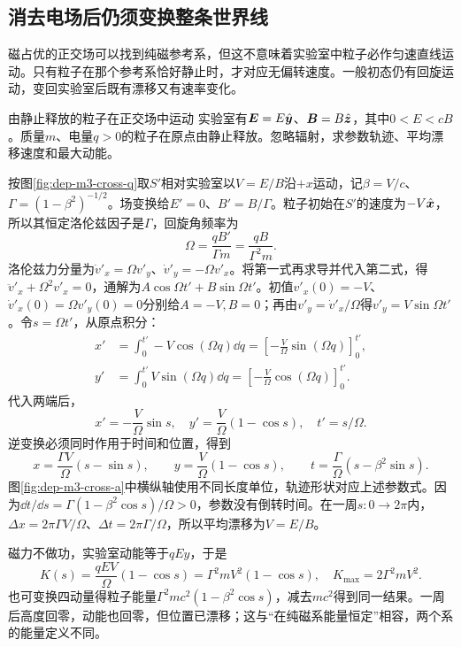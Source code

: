 \subsection{消去电场后仍须变换整条世界线}
磁占优的正交场可以找到纯磁参考系，但这不意味着实验室中粒子必作匀速直线运动。只有粒子在那个参考系恰好静止时，才对应无偏转速度。一般初态仍有回旋运动，变回实验室后既有漂移又有速率变化。

\begin{example}由静止释放的粒子在正交场中运动
实验室有$\bm{E}=E\hat{\bm{y}}$、$\bm{B}=B\hat{\bm{z}}$，其中$0<E<cB$。质量$m$、电量$q>0$的粒子在原点由静止释放。忽略辐射，求参数轨迹、平均漂移速度和最大动能。
\end{example}
\begin{solution}
按图\ref{fig:dep-m3-cross-q}取$S'$相对实验室以$V=E/B$沿$+x$运动，记$\beta=V/c$、$\Gamma=(1-\beta^2)^{-1/2}$。场变换给$E'=0$、$B'=B/\Gamma$。粒子初始在$S'$的速度为$-V\hat{\bm{x}}$，所以其恒定洛伦兹因子是$\Gamma$，回旋角频率为
\[
 \Omega=\frac{qB'}{\Gamma m}=\frac{qB}{\Gamma^2m}.
\]
洛伦兹力分量为$\dot v'_x=\Omega v'_y$、$\dot v'_y=-\Omega v'_x$。将第一式再求导并代入第二式，得$\ddot v'_x+\Omega^2v'_x=0$，通解为$A\cos\Omega t'+B\sin\Omega t'$。初值$v'_x(0)=-V$、$\dot v'_x(0)=\Omega v'_y(0)=0$分别给$A=-V,B=0$；再由$v'_y=\dot v'_x/\Omega$得$v'_y=V\sin\Omega t'$。令$s=\Omega t'$，从原点积分：
\begin{align*}
 x'&=\int_0^{t'}-V\cos(\Omega q)\dd q
 =\left[-\frac V\Omega\sin(\Omega q)\right]_0^{t'},\\
 y'&=\int_0^{t'}V\sin(\Omega q)\dd q
 =\left[-\frac V\Omega\cos(\Omega q)\right]_0^{t'}.
\end{align*}
代入两端后，
\[
 x'=-\frac V\Omega\sin s,\quad
 y'=\frac V\Omega(1-\cos s),\quad t'=s/\Omega.
\]
逆变换必须同时作用于时间和位置，得到
\[
 x=\frac{\Gamma V}{\Omega}(s-\sin s),\qquad
 y=\frac V\Omega(1-\cos s),\qquad
 t=\frac\Gamma\Omega(s-\beta^2\sin s).
\]
图\ref{fig:dep-m3-cross-a}中横纵轴使用不同长度单位，轨迹形状对应上述参数式。因为$\dd t/\dd s=\Gamma(1-\beta^2\cos s)/\Omega>0$，参数没有倒转时间。在一周$s:0\to2\pi$内，$\Delta x=2\pi\Gamma V/\Omega$、$\Delta t=2\pi\Gamma/\Omega$，所以平均漂移为$V=E/B$。

磁力不做功，实验室动能等于$qEy$，于是
\[
 K(s)=\frac{qEV}{\Omega}(1-\cos s)
 =\Gamma^2mV^2(1-\cos s),\quad
 K_{\max}=2\Gamma^2mV^2.
\]
也可变换四动量得粒子能量$\Gamma^2mc^2(1-\beta^2\cos s)$，减去$mc^2$得到同一结果。一周后高度回零，动能也回零，但位置已漂移；这与“在纯磁系能量恒定”相容，两个系的能量定义不同。
\end{solution}
